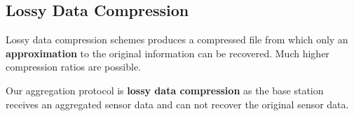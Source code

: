 \documentclass[%
  slidesonly,%
  semlayer%
  ]{seminar}                                  %
\begin{document}
\begin{slide}

        






  \subsection*{Lossy Data Compression}
    \vfill
    Lossy data compression schemes produces a compressed file from which only an \textbf{approximation} to the original information can be recovered. Much higher compression ratios are possible.

    Our aggregation protocol is \textbf{lossy data compression} as the base station receives an aggregated sensor data and can not recover the original sensor data.
    \vfill
    \clearpage


\end{slide}
\end{document}

